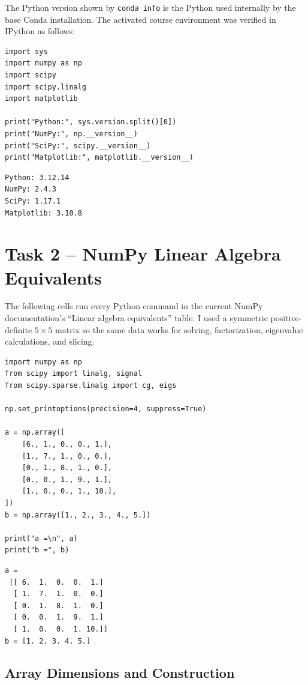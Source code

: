 \documentclass[11pt]{article}
\newcommand{\code}[1]{\texttt{#1}}
\begin{document}
The Python version shown by \code{conda info} is the Python used internally by
the base Conda installation. The activated course environment was verified in
IPython as follows:

\begin{lstlisting}[style=python]
import sys
import numpy as np
import scipy
import scipy.linalg
import matplotlib

print("Python:", sys.version.split()[0])
print("NumPy:", np.__version__)
print("SciPy:", scipy.__version__)
print("Matplotlib:", matplotlib.__version__)
\end{lstlisting}

\begin{lstlisting}[style=terminal]
Python: 3.12.14
NumPy: 2.4.3
SciPy: 1.17.1
Matplotlib: 3.10.8
\end{lstlisting}

\clearpage
\section{Task 2 -- NumPy Linear Algebra Equivalents}

The following cells run every Python command in the current NumPy
documentation's ``Linear algebra equivalents'' table. I used a symmetric
positive-definite $5\times5$ matrix so the same data works for solving,
factorization, eigenvalue calculations, and slicing.

\begin{lstlisting}[style=python]
import numpy as np
from scipy import linalg, signal
from scipy.sparse.linalg import cg, eigs

np.set_printoptions(precision=4, suppress=True)

a = np.array([
    [6., 1., 0., 0., 1.],
    [1., 7., 1., 0., 0.],
    [0., 1., 8., 1., 0.],
    [0., 0., 1., 9., 1.],
    [1., 0., 0., 1., 10.],
])
b = np.array([1., 2., 3., 4., 5.])

print("a =\n", a)
print("b =", b)
\end{lstlisting}

\begin{lstlisting}[style=terminal]
a =
 [[ 6.  1.  0.  0.  1.]
  [ 1.  7.  1.  0.  0.]
  [ 0.  1.  8.  1.  0.]
  [ 0.  0.  1.  9.  1.]
  [ 1.  0.  0.  1. 10.]]
b = [1. 2. 3. 4. 5.]
\end{lstlisting}

\subsection{Array Dimensions and Construction}
\end{document}
